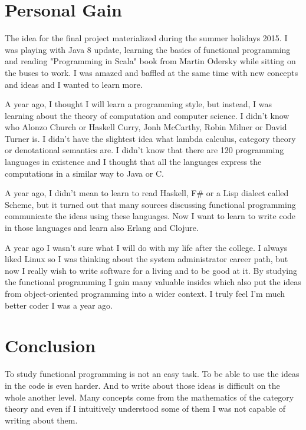 \documentclass[12pt,twoside,a4paper]{report}
\begin{document}
\section{Personal Gain}\label{7.3}
The idea for the final project materialized during the summer holidays 2015. I was playing with Java 8 update, learning the basics of functional programming and reading "Programming in Scala" book from Martin Odersky\cite{36} while sitting on the buses to work. I was amazed and baffled at the same time with new concepts and ideas and I wanted to learn more.

A year ago, I thought I will learn a programming style, but instead, I was learning about the theory of computation and computer science. I didn't know who Alonzo Church or Haskell Curry, Jonh McCarthy, Robin Milner or David Turner is. I didn't have the slightest idea what lambda calculus, category theory or denotational semantics are. I didn't know that there are 120 programming languages in existence and I thought that all the languages express the computations in a similar way to Java or C.

A year ago, I didn't mean to learn to read Haskell, F\# or a Lisp dialect called Scheme, but it turned out that many sources discussing functional programming communicate the ideas using these languages. Now I want to learn to write code in those languages and learn also Erlang and Clojure.

A year ago I wasn't sure what I will do with my life after the college. I always liked Linux so I was thinking about the system administrator career path, but now I really wish to write software for a living and to be good at it. By studying the functional programming I gain many valuable insides which also put the ideas from object-oriented programming into a wider context. I truly feel I'm much better coder I was a year ago.

\section{Conclusion}\label{7.3}
To study functional programming is not an easy task. To be able to use the ideas in the code is even harder. And to write about those ideas is difficult on the whole another level. Many concepts come from the mathematics of the category theory and even if I intuitively understood some of them I was not capable of writing about them.
\end{document}

